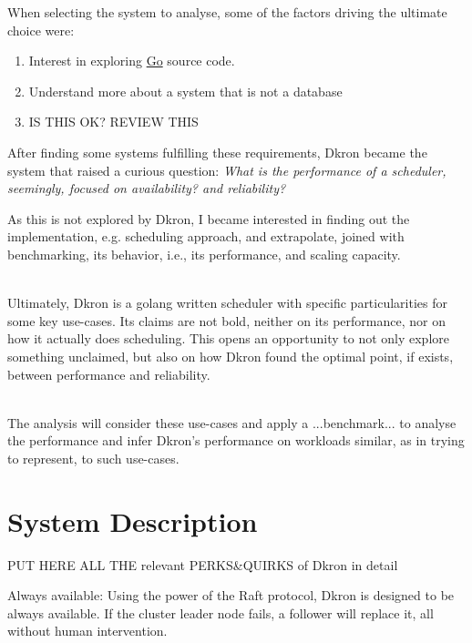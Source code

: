 \documentclass[runningheads]{llncs}
\begin{document}
\break
When selecting the system to analyse, some of the factors driving the ultimate choice were:
\begin{enumerate}
    \item Interest in exploring \href{https://go.dev/}{Go} source code.
    \item Understand more about a system that is not a database
    \item IS THIS OK? REVIEW THIS
\end{enumerate}
After finding some systems fulfilling these requirements, Dkron became the system that raised a curious question:
\textit{What is the performance of a scheduler, seemingly, focused on availability? and reliability?}

As this is not explored by Dkron, I became interested in finding out the implementation, e.g. scheduling approach, and extrapolate,
joined with benchmarking, its behavior, i.e., its performance, and scaling capacity.

~\\
Ultimately, Dkron is a golang written scheduler with specific particularities for some key use-cases.
Its claims are not bold, neither on its performance, nor on how it actually does scheduling. This opens an
opportunity to not only explore something unclaimed, but also on how Dkron found the
optimal point, if exists, between performance and reliability.


~\\ The analysis will consider these use-cases and apply a ...benchmark... to analyse the performance and infer Dkron's
performance on workloads similar, as in trying to represent, to such use-cases.

\section{System Description}
\label{system_description}

PUT HERE ALL THE relevant PERKS\&QUIRKS of Dkron in detail

Always available: Using the power of the Raft protocol, Dkron is designed to be always available. If the cluster leader node fails, a follower will replace it, all without human intervention.
\end{document}
